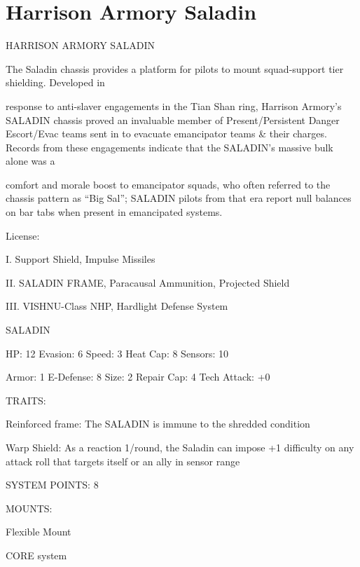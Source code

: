 \section{Harrison Armory Saladin}

                                HARRISON ARMORY SALADIN

The Saladin chassis provides a platform for pilots to mount squad-support tier shielding. Developed in

response to anti-slaver engagements in the Tian Shan ring, Harrison Armory’s SALADIN chassis proved an
invaluable member of Present/Persistent Danger Escort/Evac teams sent in to evacuate emancipator teams
\& their charges. Records from these engagements indicate that the SALADIN’s massive bulk alone was a

comfort and morale boost to emancipator squads, who often referred to the chassis pattern as “Big Sal”;
SALADIN pilots from that era report null balances on bar tabs when present in emancipated systems.

                                                   License:

I. Support Shield, Impulse Missiles

II. SALADIN FRAME, Paracausal Ammunition, Projected Shield

III. VISHNU-Class NHP, Hardlight Defense System


                                                 SALADIN

 HP: 12         Evasion: 6                            Speed: 3            Heat Cap: 8        Sensors: 10

 Armor: 1       E-Defense: 8                          Size: 2             Repair Cap: 4      Tech Attack:
                                                                                             +0

                                                   TRAITS:

 Reinforced frame: The SALADIN is immune to the shredded condition

 Warp Shield: As a reaction 1/round, the Saladin can impose +1 difficulty on any attack roll that targets
 itself or an ally in sensor range

                                             SYSTEM POINTS: 8

                                                  MOUNTS:

 Flexible Mount

                                                CORE system




